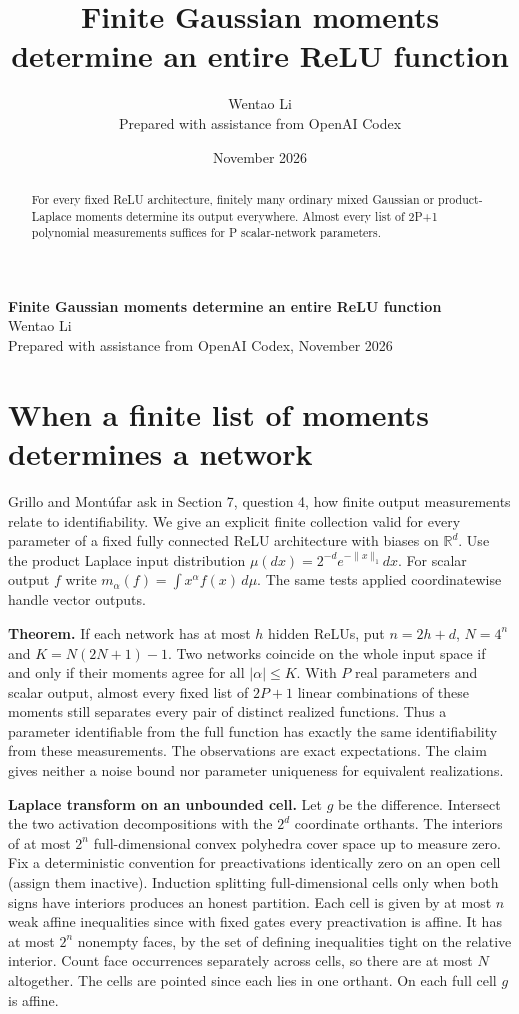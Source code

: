 \documentclass[10pt]{article}
\title{Finite Gaussian moments determine an entire ReLU function}
\author{Wentao Li\\{\small Prepared with assistance from OpenAI Codex}}
\date{November 2026}
\begin{document}
\begin{center}{\Large\bfseries Finite Gaussian moments determine an entire ReLU function}\\[3pt]Wentao Li\\{\small Prepared with assistance from OpenAI Codex, November 2026}\end{center}
\begin{abstract}
For every fixed ReLU architecture, finitely many ordinary mixed Gaussian or product-Laplace moments determine its output everywhere. Almost every list of 2P+1 polynomial measurements suffices for P scalar-network parameters.
\end{abstract}
\section*{When a finite list of moments determines a network}
Grillo and Mont\'ufar ask in Section 7, question 4, how finite output measurements relate to identifiability. We give an explicit finite collection valid for every parameter of a fixed fully connected ReLU architecture with biases on $\mathbb R^d$. Use the product Laplace input distribution $\mu(dx)=2^{-d}e^{-\|x\|_1}dx$. For scalar output $f$ write $m_\alpha(f)=\int x^\alpha f(x)\,d\mu$. The same tests applied coordinatewise handle vector outputs.

\textbf{Theorem.} If each network has at most $h$ hidden ReLUs, put $n=2h+d$, $N=4^n$ and $K=N(2N+1)-1$. Two networks coincide on the whole input space if and only if their moments agree for all $|\alpha|\le K$. With $P$ real parameters and scalar output, almost every fixed list of $2P+1$ linear combinations of these moments still separates every pair of distinct realized functions. Thus a parameter identifiable from the full function has exactly the same identifiability from these measurements. The observations are exact expectations. The claim gives neither a noise bound nor parameter uniqueness for equivalent realizations.

\textbf{Laplace transform on an unbounded cell.} Let $g$ be the difference. Intersect the two activation decompositions with the $2^d$ coordinate orthants. The interiors of at most $2^n$ full-dimensional convex polyhedra cover space up to measure zero. Fix a deterministic convention for preactivations identically zero on an open cell (assign them inactive). Induction splitting full-dimensional cells only when both signs have interiors produces an honest partition. Each cell is given by at most $n$ weak affine inequalities since with fixed gates every preactivation is affine. It has at most $2^n$ nonempty faces, by the set of defining inequalities tight on the relative interior. Count face occurrences separately across cells, so there are at most $N$ altogether. The cells are pointed since each lies in one orthant. On each full cell $g$ is affine.
\end{document}
